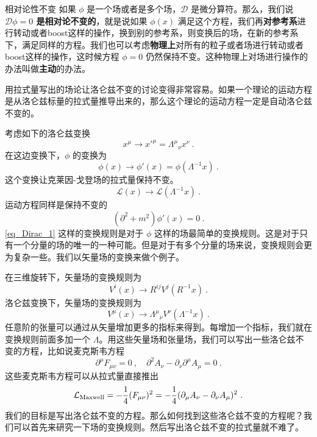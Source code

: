 
\begin{definition}{相对论性不变}
如果 $\phi$ 是一个场或者是多个场，$\mathcal D$ 是微分算符。那么，我们说\textbf{$\mathcal D \phi = 0$ 是相对论不变的}，就是说如果 $\phi(x)$ 满足这个方程，我们再\textbf{对参考系}进行转动或者boost这样的操作，换到别的参考系，则变换后的场，在新的参考系下，满足同样的方程。我们也可以考虑\textbf{物理上}对所有的粒子或者场进行转动或者boost这样的操作，这时候方程 $\mathcal\phi = 0$ 仍然保持不变。这种物理上对场进行操作的办法叫做\textbf{主动}的办法。
\end{definition}
用拉式量写出的场论让洛仑兹不变的讨论变得非常容易。如果一个理论的运动方程是从洛仑兹标量的拉式量推导出来的，那么这个理论的运动方程一定是自动洛仑兹不变的。

考虑如下的洛仑兹变换
\begin{equation}
x^\mu \rightarrow x'^\mu = \Lambda^\mu{}_\nu x^\nu ~. 
\end{equation}
在这边变换下，$\phi$ 的变换为
\begin{equation}\label{eq_Dirac_1}
\phi(x)\rightarrow \phi'(x)=\phi(\Lambda^{-1}x)~.
\end{equation}
这个变换让克莱因-戈登场的拉式量保持不变。
\begin{equation}
\mathcal L(x)\rightarrow \mathcal L(\Lambda^{-1}x)~.
\end{equation}
运动方程同样是保持不变的
\begin{equation}
(\partial^2+m^2)\phi'(x) = 0 ~.
\end{equation}
\autoref{eq_Dirac_1} 这样的变换规则是对于 $\phi$ 这样的场最简单的变换规则。这是对于只有一个分量的场的唯一的一种可能。但是对于有多个分量的场来说，变换规则会更为复杂一些。我们以矢量场的变换来做个例子。

在三维旋转下，矢量场的变换规则为
\begin{equation}
V^i(x) \rightarrow R^{ij} V^j (R^{-1}x)~.
\end{equation}
洛仑兹变换下，矢量场的变换规则为
\begin{equation}
V^\mu(x) \rightarrow \Lambda^\mu{}_{\nu}V^\nu(\Lambda^{-1}x)~.
\end{equation}
任意阶的张量可以通过从矢量增加更多的指标来得到。每增加一个指标，我们就在变换规则前面多加一个 $\Lambda$。用这些矢量场和张量场，我们可以写出一些洛仑兹不变的方程，比如说麦克斯韦方程
\begin{equation}
\partial^\mu F_{\mu\nu} = 0~,\quad \partial^2 A_\nu -\partial_\nu \partial^\mu A_\mu = 0~.  
\end{equation}
这些麦克斯韦方程可以从拉式量直接推出
\begin{equation}
\mathcal L_{\rm Maxwell} = - \frac{1}{4} (F_{\mu\nu})^2 = - \frac{1}{4} (\partial_\mu A_\nu - \partial_\nu A_\mu)^2~. 
\end{equation}
我们的目标是写出洛仑兹不变的方程。那么如何找到这些洛仑兹不变的方程呢？我们可以首先来研究一下场的变换规则。然后写出洛仑兹不变的拉式量就不难了。

